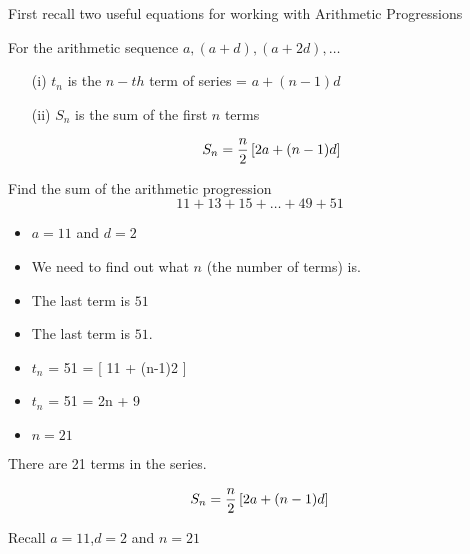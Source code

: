 

First recall two useful equations for working with Arithmetic Progressions


For the arithmetic sequence $a,(a+d) ,(a+2d), \ldots$

\begin{itemize}
\item[(i)] $t_n$ is the $n-th$ term of series = $a+(n-1)d$

\item[(ii)] $S_n$ is the sum of the first $n$ terms

\[ S_n  = {n \over 2} \left[ 2a+(n-1)d \right] \]
\end{itemize}



Find the sum of the arithmetic progression
{
\[ 11 + 13 + 15 + \dots + 49 + 51 \]
}

\begin{itemize}
\item $a=11$ and $d=2$
\item We need to find out what $n$ (the number of terms) is.
\item The last term is $51$
\end{itemize}




\begin{itemize}
\item The last term is $51$.
\item $t_n$ = 51 = [ 11 + (n-1)2 ] 
\item $t_n$ = 51 = 2n + 9
\item $n=21$
\end{itemize}
There are 21 terms in the series.




\[ S_n  = {n \over 2} \left[ 2a+(n-1)d \right] \]

Recall $a=11$,$d=2$ and $n=21$


\[ \phantom{S_n  = {21 \over 2} \left[ (2.11) +[(21-1)2] \right]} \]
\[ \phantom{S_n  = 10.5 \left[ 22 + 40 \right]  = 10.5 \times 62}\]
\[ \phantom{S_n  = 651} \] 

